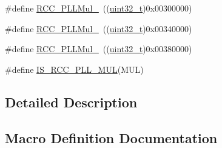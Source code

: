 \begin{DoxyCompactItemize}
\item 
\#define \hyperlink{group___p_l_l__multiplication__factor_ga457e11adfe1e815eeb5f38de61a94328}{R\+C\+C\+\_\+\+P\+L\+L\+Mul\+\_}~((\hyperlink{_p_e___types_8h_a33594304e786b158f3fb30289278f5af}{uint32\+\_\+t})0x00300000)
\item 
\#define \hyperlink{group___p_l_l__multiplication__factor_gaad1fbc2e251391b4c469e39ccf05d642}{R\+C\+C\+\_\+\+P\+L\+L\+Mul\+\_}~((\hyperlink{_p_e___types_8h_a33594304e786b158f3fb30289278f5af}{uint32\+\_\+t})0x00340000)
\item 
\#define \hyperlink{group___p_l_l__multiplication__factor_ga98118a80e57ed822485df8a8bef3cb1f}{R\+C\+C\+\_\+\+P\+L\+L\+Mul\+\_}~((\hyperlink{_p_e___types_8h_a33594304e786b158f3fb30289278f5af}{uint32\+\_\+t})0x00380000)
\item 
\#define \hyperlink{group___p_l_l__multiplication__factor_gaad04edea77632618678f528dcb2b0cd5}{I\+S\+\_\+\+R\+C\+C\+\_\+\+P\+L\+L\+\_\+\+M\+UL}(M\+UL)
\end{DoxyCompactItemize}


\subsection{Detailed Description}


\subsection{Macro Definition Documentation}
